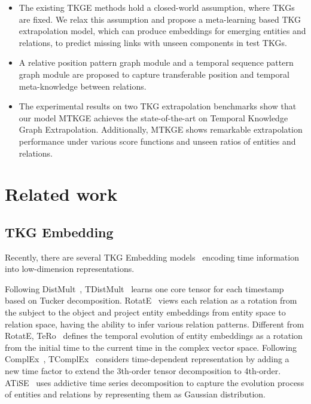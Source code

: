 \documentclass[sigconf]{acmart}
\begin{document}
\begin{itemize}[leftmargin=*]

\item The existing TKGE methods hold a closed-world assumption, where TKGs are fixed. We relax this assumption and propose a meta-learning based TKG extrapolation model, which can produce embeddings for emerging entities and relations, to predict missing links with unseen components in test TKGs.



\item A relative position pattern graph module and a temporal sequence pattern graph module are proposed to capture transferable position and temporal meta-knowledge between relations.

\item The experimental results on two TKG extrapolation benchmarks show that our model MTKGE  achieves the state-of-the-art on Temporal Knowledge Graph Extrapolation. Additionally, MTKGE shows remarkable extrapolation performance under various score functions and unseen ratios of entities and relations.
\end{itemize}

\section{Related work}

\subsection{TKG Embedding }

Recently, there are several TKG Embedding models~\citep{10.5555/2999792.2999923,Dasgupta2018HyTEHT,jain-etal-2020-temporal, jiang-etal-2016-towards} encoding time information into low-dimension representations.

Following DistMult~\citep{DistMult}, TDistMult~\citep{TDistMult} learns one core
tensor for each timestamp based on Tucker decomposition.
RotatE~\citep{RotatE} views each relation as a rotation from the subject to the object and project entity embeddings from entity space to relation space, having the ability to infer various relation patterns.
Different from RotatE, TeRo~\citep{TeRo} defines the temporal evolution of entity embeddings as a rotation from the initial time to the current time in the complex vector space.
Following ComplEx~\citep{ComplEx}, TComplEx~\citep{TComplEx} considers time-dependent representation by adding a new time factor to extend the 3th-order tensor decomposition to 4th-order. ATiSE~\citep{ATISE} uses addictive time series decomposition to capture the evolution process of entities and relations by representing them as
Gaussian distribution.
\end{document}
